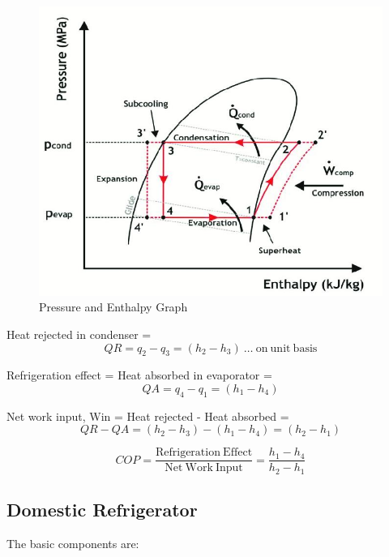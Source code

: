 \documentclass[11pt]{article}
\begin{document}
\begin{figure}[H]
	\centering
	\includegraphics[scale=0.5]{PH graph.jpg}
	\caption{Pressure and Enthalpy Graph \cite{ph graph}}
	\label{fig:PH graph}
\end{figure}

\pagebreak

Heat rejected in condenser = \\
$$ QR = q_2 - q_3 = (h_2-h_3)\ \ldots\ \mathrm{on\ unit\ basis}$$

Refrigeration effect = Heat absorbed in evaporator = 
$$QA = q_4-q_1 = (h_1-h_4)$$

Net work input, Win = Heat rejected - Heat absorbed = 
$$QR - QA = (h_2-h_3) - (h_1-h_4) = (h_2-h_1)$$

$$COP = \frac{\mathrm{Refrigeration\ Effect}}{\mathrm{Net\ Work\ Input}} = \frac{h_1-h_4}{h_2-h_1}$$

\subsection{Domestic Refrigerator}
The basic components are: 
\end{document}
